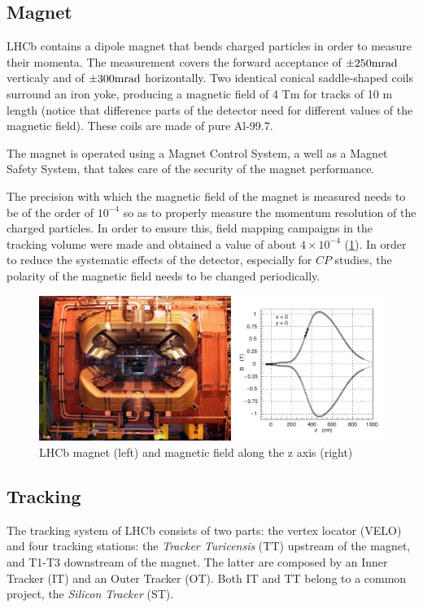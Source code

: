 \subsection{Magnet} %
LHCb contains a dipole magnet that bends charged particles in order to measure their momenta. The measurement covers the forward acceptance of $\pm 250 \rm mrad$ verticaly and of $\pm 300 \rm mrad$ horizontally. Two identical conical saddle-shaped coils surround an iron yoke, producing a magnetic field of 4 Tm for tracks of 10 m length (notice that difference parts of the detector need for different values of the magnetic field). These coils are made of pure Al-99.7. 

The magnet is operated using a Magnet Control System, a well as a Magnet Safety System, that takes care of the security of the magnet performance. 

The precision with which the magnetic field of the magnet is measured needs to be of the order of $10^{-4}$ so as to properly measure the momentum resolution of the charged particles. In order to ensure this, field mapping campaigns in the tracking volume were made and obtained a value of about $4\times 10^{-4}$ (\ref{fig:lhcbmagnet}). In order to reduce the systematic effects of the detector, especially for $CP$ studies, the polarity of the magnetic field needs to be changed periodically. 

\begin{figure} [htb!]
\begin{center}
\includegraphics[scale=0.35]{figs/magnet.jpg}
\caption{LHCb magnet (left) and magnetic field along the z axis (right)\label{fig:lhcbmagnet}}
\end{center}
\end{figure}

\subsection{Tracking} %
\label{sec:Tracking}
The tracking system of LHCb consists of two parts: the vertex locator (VELO) and four tracking stations: the \textit{Tracker Turicensis} (TT) upstream of the magnet, and T1-T3 downstream of the magnet. The latter are composed by an Inner Tracker (IT) and an Outer Tracker (OT). Both IT and TT belong to a common project, the \textit{Silicon Tracker} (ST). 

